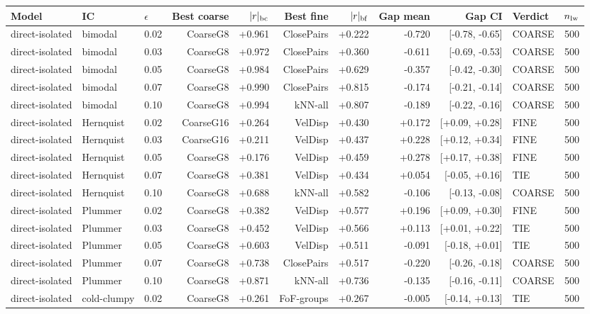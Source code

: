 \begin{tabular}{lllrrrrrrlr}
\toprule
Model & IC & $\epsilon$ & Best coarse & $|r|_{\rm bc}$ & Best fine & $|r|_{\rm bf}$ & Gap mean & Gap CI & Verdict & $n_{\rm lw}$\\
\midrule
direct-isolated & bimodal & 0.02 & CoarseG8 & +0.961 & ClosePairs & +0.222 & -0.720 & [-0.78, -0.65] & COARSE & 500\\
direct-isolated & bimodal & 0.03 & CoarseG8 & +0.972 & ClosePairs & +0.360 & -0.611 & [-0.69, -0.53] & COARSE & 500\\
direct-isolated & bimodal & 0.05 & CoarseG8 & +0.984 & ClosePairs & +0.629 & -0.357 & [-0.42, -0.30] & COARSE & 500\\
direct-isolated & bimodal & 0.07 & CoarseG8 & +0.990 & ClosePairs & +0.815 & -0.174 & [-0.21, -0.14] & COARSE & 500\\
direct-isolated & bimodal & 0.10 & CoarseG8 & +0.994 & kNN-all & +0.807 & -0.189 & [-0.22, -0.16] & COARSE & 500\\
direct-isolated & Hernquist & 0.02 & CoarseG16 & +0.264 & VelDisp & +0.430 & +0.172 & [+0.09, +0.28] & FINE & 500\\
direct-isolated & Hernquist & 0.03 & CoarseG16 & +0.211 & VelDisp & +0.437 & +0.228 & [+0.12, +0.34] & FINE & 500\\
direct-isolated & Hernquist & 0.05 & CoarseG8 & +0.176 & VelDisp & +0.459 & +0.278 & [+0.17, +0.38] & FINE & 500\\
direct-isolated & Hernquist & 0.07 & CoarseG8 & +0.381 & VelDisp & +0.434 & +0.054 & [-0.05, +0.16] & TIE & 500\\
direct-isolated & Hernquist & 0.10 & CoarseG8 & +0.688 & kNN-all & +0.582 & -0.106 & [-0.13, -0.08] & COARSE & 500\\
direct-isolated & Plummer & 0.02 & CoarseG8 & +0.382 & VelDisp & +0.577 & +0.196 & [+0.09, +0.30] & FINE & 500\\
direct-isolated & Plummer & 0.03 & CoarseG8 & +0.452 & VelDisp & +0.566 & +0.113 & [+0.01, +0.22] & TIE & 500\\
direct-isolated & Plummer & 0.05 & CoarseG8 & +0.603 & VelDisp & +0.511 & -0.091 & [-0.18, +0.01] & TIE & 500\\
direct-isolated & Plummer & 0.07 & CoarseG8 & +0.738 & ClosePairs & +0.517 & -0.220 & [-0.26, -0.18] & COARSE & 500\\
direct-isolated & Plummer & 0.10 & CoarseG8 & +0.871 & kNN-all & +0.736 & -0.135 & [-0.16, -0.11] & COARSE & 500\\
direct-isolated & cold-clumpy & 0.02 & CoarseG8 & +0.261 & FoF-groups & +0.267 & -0.005 & [-0.14, +0.13] & TIE & 500\\

\end{tabular}
